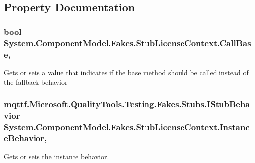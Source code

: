 \subsection{Property Documentation}
\hypertarget{class_system_1_1_component_model_1_1_fakes_1_1_stub_license_context_a34521064d81d879fd4c2aee412ea5fe1}{
\subsubsection[{Call\-Base}]{\setlength{\rightskip}{0pt plus 5cm}bool System.\-Component\-Model.\-Fakes.\-Stub\-License\-Context.\-Call\-Base\hspace{0.3cm}{\ttfamily [get]}, {\ttfamily [set]}}}\label{class_system_1_1_component_model_1_1_fakes_1_1_stub_license_context_a34521064d81d879fd4c2aee412ea5fe1}


Gets or sets a value that indicates if the base method should be called instead of the fallback behavior

\hypertarget{class_system_1_1_component_model_1_1_fakes_1_1_stub_license_context_affe0109ed114d2323765db88160f33f8}{
\subsubsection[{Instance\-Behavior}]{\setlength{\rightskip}{0pt plus 5cm}mqttf.\-Microsoft.\-Quality\-Tools.\-Testing.\-Fakes.\-Stubs.\-I\-Stub\-Behavior System.\-Component\-Model.\-Fakes.\-Stub\-License\-Context.\-Instance\-Behavior\hspace{0.3cm}{\ttfamily [get]}, {\ttfamily [set]}}}\label{class_system_1_1_component_model_1_1_fakes_1_1_stub_license_context_affe0109ed114d2323765db88160f33f8}


Gets or sets the instance behavior.

